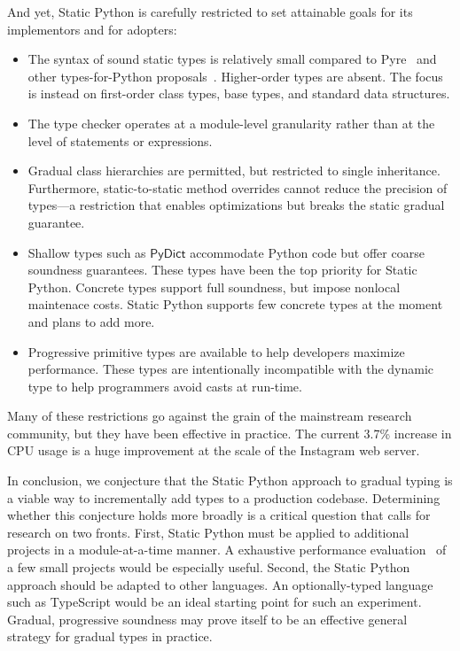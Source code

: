 \documentclass[english,cleveref,submission]{programming}
\newcommand{\SP}{Static Python}
\newcommand{\CPUchange}{3.7\%}
\newcommand{\typefont}[1]{\mathsf{#1}}
\newcommand{\sptrawpydict}{\typefont{PyDict}}
\begin{document}
And yet, \SP{} is carefully restricted to set attainable goals
for its implementors and for adopters:
\begin{itemize}
  \item
    The syntax of sound static types is relatively small compared
    to Pyre~\cite{pyre} and other types-for-Python proposals~\cite{mypy,pytype}.
    Higher-order types are absent.
    The focus is instead on first-order class types, base types, and standard data structures.
  \item
    The type checker operates at a module-level granularity rather
    than at the level of statements or expressions.
  \item
    Gradual class hierarchies are permitted, but restricted to single inheritance.
    Furthermore, static-to-static method overrides cannot reduce the precision of types---a restriction
    that enables optimizations but breaks the static gradual guarantee.
  \item
    Shallow types such as $\sptrawpydict$ accommodate Python code but offer coarse
    soundness guarantees.
    These types have been the top priority for \SP{}.
    Concrete types support full soundness, but impose nonlocal maintenace costs.
    \SP{} supports few concrete types at the moment and plans to add more.
  \item
    Progressive primitive types are available to help developers maximize performance.
    These types are intentionally incompatible with the dynamic type to help programmers
    avoid casts at run-time.
\end{itemize}
%
Many of these restrictions go against the grain of the mainstream
research community, but they have been effective in practice.
The current \CPUchange{} increase in CPU usage is a huge improvement
at the scale of the Instagram web server.

In conclusion, we conjecture that the \SP{} approach to gradual typing
is a viable way to incrementally add types to a production codebase.
Determining whether this conjecture holds more broadly is a critical
question that calls for research on two fronts.
First, \SP{} must be applied to additional projects in a module-at-a-time manner.
A exhaustive performance evaluation~\cite{gtnffvf-jfp-2019} of a few small projects would be
especially useful.
Second, the \SP{} approach should be adapted to other languages.
An optionally-typed language such as TypeScript would be an ideal starting
point for such an experiment.
Gradual, progressive soundness may prove itself to be an effective general strategy for
gradual types in practice.
\end{document}
